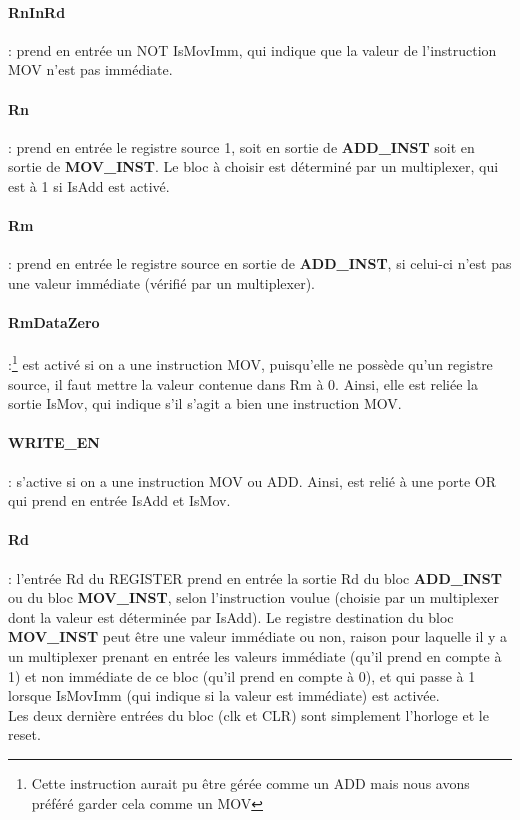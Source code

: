 \documentclass[a4paper]{article} %
\begin{document}
\paragraph{RnInRd}: prend en entrée un NOT IsMovImm, qui indique que la valeur de l'instruction MOV n'est pas immédiate.\\

\paragraph{Rn}: prend en entrée le registre source 1, soit en sortie de \textbf{ADD\_INST} soit en sortie de \textbf{MOV\_INST}. Le bloc à choisir est déterminé par un multiplexer, qui est à 1 si IsAdd est activé.\\

\paragraph{Rm}: prend en entrée le registre source en sortie de \textbf{ADD\_INST}, si celui-ci n'est pas une valeur immédiate (vérifié par un multiplexer).\\

\paragraph{RmDataZero}:\footnote{Cette instruction aurait pu être gérée comme un ADD mais nous avons préféré garder cela comme un MOV} est activé si on a une instruction MOV, puisqu'elle ne possède qu'un registre source, il faut mettre la valeur contenue dans Rm à 0. Ainsi, elle est reliée la sortie IsMov, qui indique s'il s'agit a bien une instruction MOV.\\

\paragraph{WRITE\_EN}: s'active si on a une instruction MOV ou ADD. Ainsi, est relié à une porte OR qui prend en entrée IsAdd et IsMov.\\

\paragraph{Rd}: l'entrée Rd du REGISTER prend en entrée la sortie Rd du bloc \textbf{ADD\_INST} ou du bloc \textbf{MOV\_INST}, selon l'instruction voulue (choisie par un multiplexer dont la valeur est déterminée par IsAdd). Le registre destination du bloc \textbf{MOV\_INST} peut être une valeur immédiate ou non, raison pour laquelle il y a un multiplexer prenant en entrée les valeurs immédiate (qu'il prend en compte à 1) et non immédiate de ce bloc (qu'il prend en compte à 0), et qui passe à 1 lorsque IsMovImm (qui indique si la valeur est immédiate) est activée.
\medskip \\
Les deux dernière entrées du bloc (clk et CLR) sont simplement l'horloge et le reset.
\end{document}
